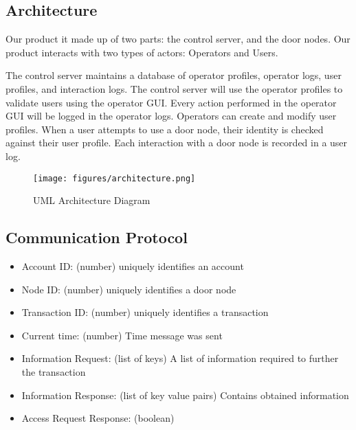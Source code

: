 \subsection{Architecture}

Our product it made up of two parts: the control server, and the door nodes.
Our product interacts with two types of actors: Operators and Users.

The control server maintains a database of operator profiles, operator logs,
user profiles, and interaction logs.  The control server will use the operator
profiles to validate users using the operator GUI.  Every action performed in
the operator GUI will be logged in the operator logs.  Operators can create and
modify user profiles.  When a user attempts to use a door node, their identity
is checked against their user profile.  Each interaction with a door node is
recorded in a user log.

\begin{figure}[!htb]
\centering
\texttt{[image: figures/architecture.png]}
\caption{UML Architecture Diagram}
\label{fig:architecture-diagram}
\end{figure}

\subsection{Communication Protocol}

\begin{itemize}
\item Account ID: (number) uniquely identifies an account
\item Node ID: (number) uniquely identifies a door node
\item Transaction ID: (number) uniquely identifies a transaction
\item Current time: (number) Time message was sent
\item Information Request: (list of keys) A list of information required to further the
transaction
\item Information Response: (list of key value pairs) Contains obtained information
\item Access Request Response: (boolean)
\end{itemize}

